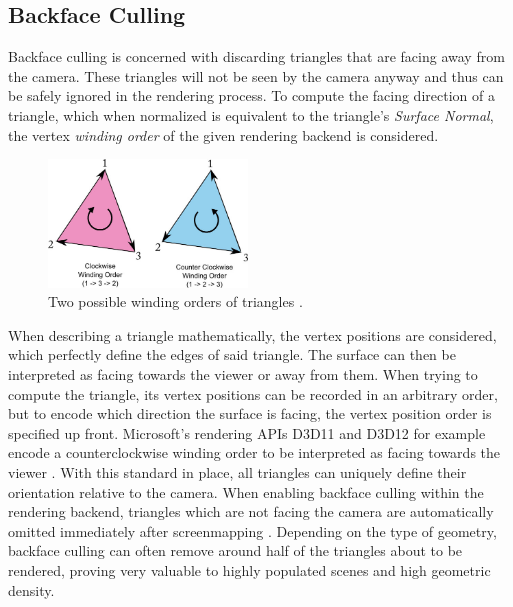 \subsection*{Backface Culling} \label{subsec-backface-culling}

Backface culling is concerned with discarding triangles that are facing away from the camera. 
These triangles will not be seen by the camera anyway and thus can be safely ignored in the rendering process. 
To compute the facing direction of a triangle, which when normalized is equivalent to the triangle's 
\emph{Surface Normal}, the vertex \emph{winding order} of the given rendering backend is considered.

\begin{figure}[h]
    \centering
    \includegraphics[width=200px]{images/graphics/winding-order-triangle.jpg}
    \caption{Two possible winding orders of triangles \cite{Michel2016}.}
    \label{fig:triangle-winding-order}
\end{figure}

\noindent
When describing a triangle mathematically, the vertex positions are considered, which perfectly define the edges of 
said triangle. The surface can then be interpreted as facing towards the viewer or away from them. 
When trying to compute the triangle, its vertex positions can be recorded in an arbitrary order, but to encode which 
direction the surface is facing, the vertex position order is specified up front. Microsoft's rendering \ac{API}s D3D11 
and D3D12 for example encode a counterclockwise winding order to be interpreted as facing towards the viewer 
\cite{D3DTopology2020}. With this standard in place, all triangles can uniquely define their orientation relative to 
the camera. When enabling backface culling within the rendering backend, triangles which are not facing the camera 
are automatically omitted immediately after screenmapping \cite{AkenineMoeller2018}. Depending on the type of geometry, 
backface culling can often remove around half of the triangles about to be rendered, proving very valuable to highly 
populated scenes and high geometric density.

